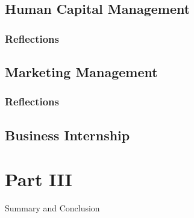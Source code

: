 \documentclass[12pt,titlepage]{article}
\begin{document}
\subsection{Human Capital Management}
\subsubsection{Reflections}


\restoregeometry


\subsection{Marketing Management}
\subsubsection{Reflections}

\subsection{Business Internship}



\section{Part III}{Summary and Conclusion}



\end{document}
